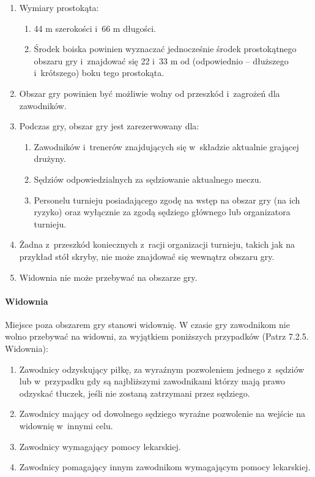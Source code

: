 \documentclass[12pt]{article}
\begin{document}
\begin{enumerate}
	\item Wymiary prostokąta:
	      \begin{enumerate}
		      \item 44 m szerokości i~66 m długości.
		      \item Środek boiska powinien wyznaczać jednocześnie środek prostokątnego
		            obszaru gry i~znajdować się 22 i~33 m od (odpowiednio -- dłuższego i~krótszego) boku tego prostokąta.
	      \end{enumerate}

	\item Obszar gry powinien być możliwie wolny od przeszkód i~zagrożeń dla
	      zawodników.

	\item Podczas gry, obszar gry jest zarezerwowany dla:
	      \begin{enumerate}
		      \item Zawodników i~trenerów znajdujących się w~składzie aktualnie grającej
		            drużyny.
		      \item Sędziów odpowiedzialnych za sędziowanie aktualnego meczu.
		      \item Personelu turnieju posiadającego zgodę na wstęp na obszar gry (na
		            ich ryzyko) oraz wyłącznie za zgodą sędziego głównego lub
		            organizatora turnieju.
	      \end{enumerate}

	\item Żadna z~przeszkód koniecznych z~racji organizacji turnieju, takich jak
	      na przykład stół skryby, nie może znajdować się wewnątrz obszaru gry.

	\item Widownia nie może przebywać na obszarze gry.
\end{enumerate}

\paragraph{Widownia}
Miejsce poza obszarem gry stanowi widownię.
W czasie gry zawodnikom nie wolno przebywać na widowni, za wyjątkiem
poniższych przypadków (Patrz 7.2.5. Widownia):

\begin{enumerate}
	\item Zawodnicy odzyskujący piłkę, za wyraźnym pozwoleniem jednego z~sędziów
	      lub w~przypadku gdy są najbliższymi zawodnikami którzy mają prawo
	      odzyskać tłuczek, jeśli nie zostaną zatrzymani przez sędziego.

	\item Zawodnicy mający od dowolnego sędziego wyraźne pozwolenie na wejście
	      na widownię w~innymi celu.

	\item Zawodnicy wymagający pomocy lekarskiej.

	\item Zawodnicy pomagający innym zawodnikom wymagającym pomocy lekarskiej.
\end{enumerate}
\end{document}
